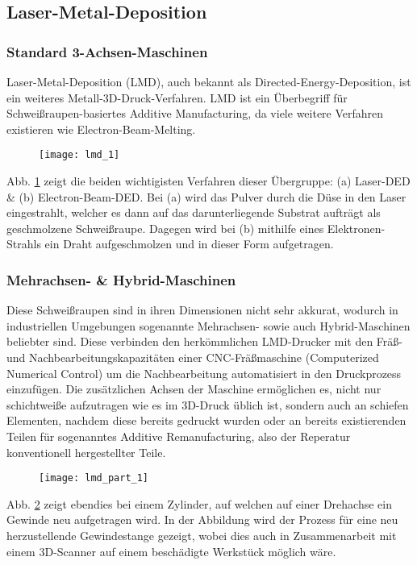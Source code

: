 \documentclass[../main.tex]{subfiles}
\begin{document}
\subsection{Laser-Metal-Deposition}
\subsubsection{Standard 3-Achsen-Maschinen}
Laser-Metal-Deposition (LMD), auch bekannt als Directed-Energy-Deposition, ist ein weiteres Metall-3D-Druck-Verfahren. LMD ist ein Überbegriff für Schweißraupen-basiertes Additive Manufacturing, da viele weitere Verfahren existieren wie Electron-Beam-Melting.
\begin{figure}[h]
	\begin{center}

		\texttt{[image: lmd\_1]}
\label{img:lmd_1}	
	\end{center}
\end{figure}
Abb. \ref{img:lmd_1} zeigt die beiden wichtigisten Verfahren dieser Übergruppe: (a) Laser-DED \& (b) Electron-Beam-DED.
Bei (a) wird das Pulver durch die Düse in den Laser eingestrahlt, welcher es dann auf das darunterliegende Substrat aufträgt als geschmolzene Schweißraupe. 
Dagegen wird bei (b) mithilfe eines Elektronen-Strahls ein Draht aufgeschmolzen und in dieser Form aufgetragen. \parencite{ALL3D_1}
\subsubsection{Mehrachsen- \& Hybrid-Maschinen}
Diese Schweißraupen sind in ihren Dimensionen nicht sehr akkurat, wodurch in  industriellen Umgebungen sogenannte Mehrachsen- sowie auch Hybrid-Maschinen beliebter sind. Diese verbinden den herkömmlichen LMD-Drucker mit den Fräß- und Nachbearbeitungskapazitäten einer CNC-Fräßmaschine (Computerized Numerical Control) um die Nachbearbeitung automatisiert in den Druckprozess einzufügen.
Die zusätzlichen Achsen der Maschine ermöglichen es, nicht nur schichtweiße aufzutragen wie es im 3D-Druck üblich ist, sondern auch an schiefen Elementen, nachdem diese bereits gedruckt wurden oder an bereits existierenden Teilen für sogenanntes Additive Remanufacturing, also der Reperatur konventionell hergestellter Teile. \parencite{ALL3D_2}
\begin{figure}[h]
	\begin{center}
	\texttt{[image: lmd\_part\_1]}	
		\label{img:lmd_part_1}
	\end{center}
	
\end{figure}
Abb. \ref{img:lmd_part_1} zeigt ebendies bei einem Zylinder, auf welchen auf einer Drehachse ein Gewinde neu aufgetragen wird. In der Abbildung wird der Prozess für eine neu herzustellende Gewindestange gezeigt, wobei dies auch in Zusammenarbeit mit einem 3D-Scanner auf einem beschädigte Werkstück möglich wäre.
\end{document}
